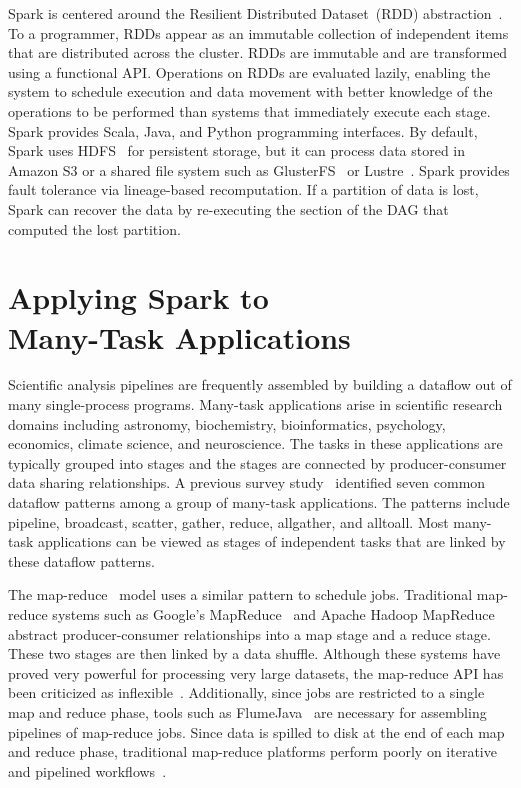\documentclass[conference]{IEEEtran}
\begin{document}
Spark is centered around the Resilient Distributed Dataset~(RDD) abstraction~\cite{zaharia12}.
To a programmer, RDDs appear as an immutable collection of independent items that are 
distributed across the cluster. RDDs are immutable and are transformed using a
functional API. Operations on RDDs are evaluated lazily, enabling the system to schedule 
execution and data movement with better knowledge of the operations to be performed than 
systems that immediately execute each stage. Spark provides Scala, Java, and Python programming interfaces.
By default, Spark uses HDFS~\cite{shvachko10} for persistent storage, but
it can process data stored in Amazon S3 or a shared file system such as
GlusterFS~\cite{davies13} or Lustre~\cite{donovan03}. Spark provides fault tolerance via
lineage-based recomputation. If a partition of data is lost, Spark can recover the data
by re-executing the section of the DAG that computed the lost partition.



\section{Applying Spark to \\ Many-Task Applications}
\label{sec:Capability}

Scientific analysis pipelines are frequently assembled by building a dataflow out of many
single-process programs. Many-task applications arise in scientific research
domains including astronomy, biochemistry, bioinformatics, psychology, economics, climate science,
and neuroscience. The tasks in these applications are typically grouped into stages and the stages are connected by
producer-consumer data sharing relationships. 
A previous survey study~\cite{katz11} identified
seven common dataflow patterns among a group of many-task applications. The patterns
include pipeline, broadcast, scatter, gather,
reduce, allgather, and alltoall. Most many-task applications
can be viewed as stages of independent tasks that are linked by these dataflow patterns.

The map-reduce~\cite{dean04} model uses a similar pattern to schedule jobs. Traditional map-reduce
systems such as Google's MapReduce~\cite{dean04} and Apache Hadoop MapReduce~\cite{HADOOP} 
abstract producer-consumer relationships into a map stage and a reduce stage. These two stages are then
linked by a data shuffle. Although these systems have proved very powerful for processing very
large datasets, the map-reduce API has been criticized as inflexible~\cite{dewitt08}.
Additionally, since jobs are restricted to a single map and reduce phase, tools such as
FlumeJava~\cite{chambers10} are necessary for assembling pipelines of map-reduce jobs. Since
data is spilled to disk at the end of each map and reduce phase, traditional map-reduce platforms perform poorly
on iterative and pipelined workflows~\cite{zaharia12}.
\end{document}
